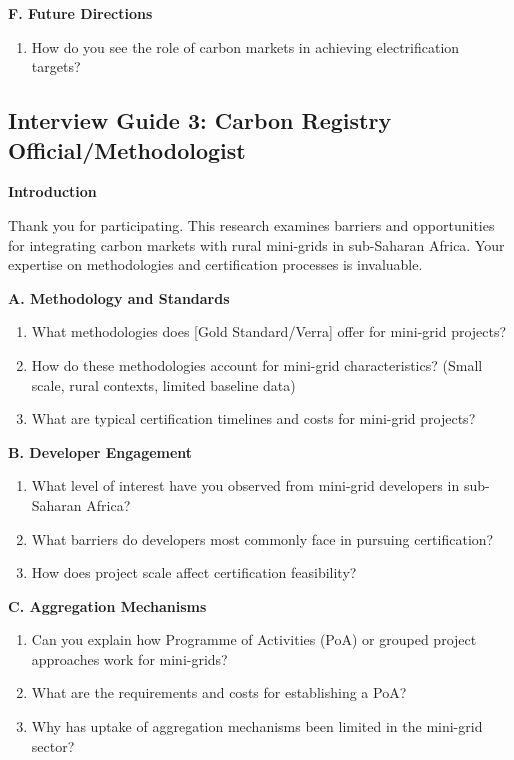 \textbf{F. Future Directions}
\begin{enumerate}[resume]
	\item How do you see the role of carbon markets in achieving electrification targets?
\end{enumerate}

\subsection{Interview Guide 3: Carbon Registry Official/Methodologist}
\textbf{Introduction}

Thank you for participating. This research examines barriers and opportunities for integrating carbon markets with rural mini-grids in sub-Saharan Africa. Your expertise on methodologies and certification processes is invaluable.

\textbf{A. Methodology and Standards}
\begin{enumerate}
	\item What methodologies does [Gold Standard/Verra] offer for mini-grid projects?
	\item How do these methodologies account for mini-grid characteristics? (Small scale, rural contexts, limited baseline data)
	\item What are typical certification timelines and costs for mini-grid projects?
\end{enumerate}

\textbf{B. Developer Engagement}
\begin{enumerate}[resume]
	\item What level of interest have you observed from mini-grid developers in sub-Saharan Africa?
	\item What barriers do developers most commonly face in pursuing certification?
	\item How does project scale affect certification feasibility?
\end{enumerate}

\textbf{C. Aggregation Mechanisms}
\begin{enumerate}[resume]
	\item Can you explain how Programme of Activities (PoA) or grouped project approaches work for mini-grids?
	\item What are the requirements and costs for establishing a PoA?
	\item Why has uptake of aggregation mechanisms been limited in the mini-grid sector?
\end{enumerate}

